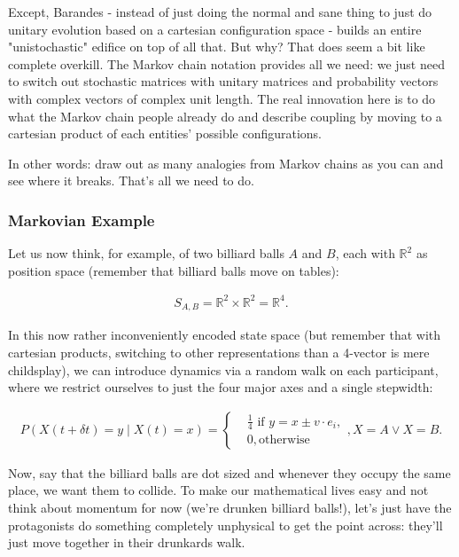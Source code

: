 \documentclass{article}
\begin{document}
Except, Barandes - instead of just doing the normal and sane thing to just do unitary evolution based on a cartesian configuration space - builds an entire "unistochastic" edifice on top of all that. But why? That does seem a bit like complete overkill. The Markov chain notation provides all we need: we just need to switch out stochastic matrices with unitary matrices and probability vectors with complex vectors of complex unit length. The real innovation here is to do what the Markov chain people already do and describe coupling by moving to a cartesian product of each entities' possible configurations.

In other words: draw out as many analogies from Markov chains as you can and see where it breaks. That's all we need to do.

\subsubsection{Markovian Example}

Let us now think, for example, of two billiard balls $A$ and $B$, each with $\mathbb{R}^2$ as position space (remember that billiard balls move on tables):

\begin{align*}
S_{A,B} = \mathbb{R}^2\times\mathbb{R}^2 = \mathbb{R}^4.
\end{align*}

In this now rather inconveniently encoded state space (but remember that with cartesian products, switching to other representations than a 4-vector is mere childsplay), we can introduce dynamics via a random walk on each participant, where we restrict ourselves to just the four major axes and a single stepwidth:

\begin{align*}
P(X(t+\delta t) = y \mid X(t) = x) = \begin{cases}
&\frac{1}{4} \text{ if } y = x\pm v\cdot e_i,\\
&0, \text{otherwise}
\end{cases}, X=A\lor X=B. 
\end{align*}

Now, say that the billiard balls are dot sized and whenever they occupy the same place, we want them to collide. To make our mathematical lives easy and not think about momentum for now (we're drunken billiard balls!), let's just have the protagonists do something completely unphysical to get the point across: they'll just move together in their drunkards walk.
\end{document}
